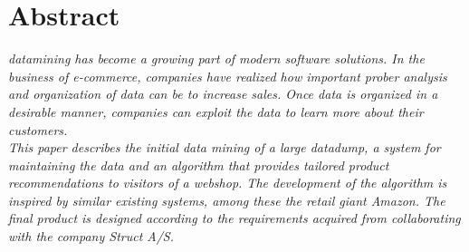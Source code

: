 \chapter{Abstract}
\textit{datamining has become a growing part of modern software solutions. In the business of e-commerce, companies have realized how important prober analysis and organization of data can be to increase sales. Once data is organized in a desirable manner, companies can exploit the data to learn more about their customers.\\
This paper describes the initial data mining of a large datadump, a system for maintaining the data and an algorithm that provides tailored product recommendations to visitors of a webshop.
The development of the algorithm is inspired by similar existing systems, among these the retail giant Amazon. The final product is designed according to the requirements acquired from collaborating with the company Struct A/S.}